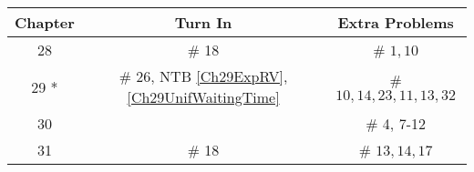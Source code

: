 \documentclass[12pt]{article}
\begin{document}
\begin{center}
\begin{tabular}{|c|c||c|}
\hline
Chapter & Turn In & Extra Problems\\
\hline



%
%
%
%
%
%
28 & \# 18  & \# $1, 10$\\
\hline	

29 * & \# 26, NTB \ref{Ch29ExpRV}, \ref{Ch29UnifWaitingTime}   & \# $10, 14, 23, 11, 13, 32$\\  %
\hline	

30 &   & \# 4, 7-12\\
\hline

31 &  \# 18  & \# $13, 14, 17$\\   %
\hline


\end{tabular}
\end{center}
\end{document}
